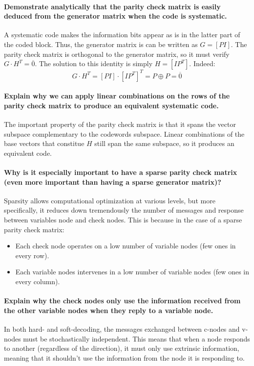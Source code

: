 \paragraph{Demonstrate analytically that the parity check matrix is easily deduced from
the generator matrix when the code is systematic.}
A systematic code makes the information bits appear as is in the latter part of the coded block. Thus, the generator matrix is can be written as $G = [P I]$. The parity check matrix is orthogonal to the generator matrix, so it must verify $G\cdot H^T = \overline{0}$. The solution to this identity is simply $H = [I P^T]$. Indeed:
\[
G \cdot H^T = [P I]\cdot[I P^T]^T = P \oplus P = \overline{0}
\]

\paragraph{Explain why we can apply linear combinations on the rows of the parity check matrix to
produce an equivalent systematic code.}
The important property of the parity check matrix is that it spans the vector subspace complementary to the codewords subspace. Linear combinations of the base vectors that constitue $H$ still span the same subspace, so it produces an equivalent code.

\paragraph{Why is it especially important to have a sparse parity check matrix (even more important
than having a sparse generator matrix)?}
Sparsity allows computational optimization at various levels, but more specifically, it reduces down tremendously the number of messages and response between variables node and check nodes. This is because in the case of a sparse parity check matrix:
\begin{itemize}
  \item Each check node operates on a low number of variable nodes (few ones in every row).
  \item Each variable nodes intervenes in a low number of variable nodes (few ones in every column).
\end{itemize}

\paragraph{Explain why the check nodes only use the information received from the other variable
nodes when they reply to a variable node.}
In both hard- and soft-decoding, the messages exchanged between c-nodes and v-nodes must be stochastically independent. This means that when a node responds to another (regardless of the direction), it must only use extrinsic information, meaning that it shouldn't use the information from the node it is responding to.
